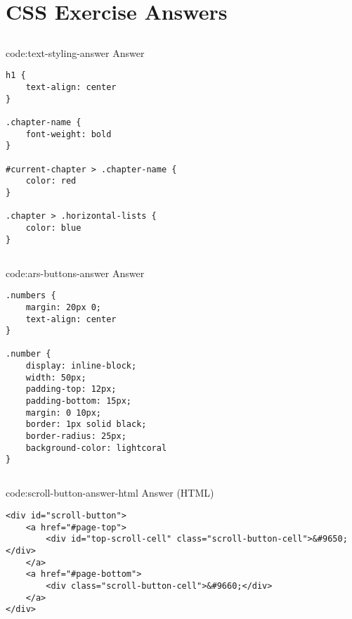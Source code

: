 \section{CSS Exercise Answers}\label{sect:css-exercise-answers}

\subsection*{}

\begin{codeenv}{code:text-styling-answer}{ Answer}\begin{verbatim}
h1 {
    text-align: center
}

.chapter-name {
    font-weight: bold
}

#current-chapter > .chapter-name {
    color: red
}

.chapter > .horizontal-lists {
    color: blue
}
\end{verbatim}
\end{codeenv}

\subsection*{}

\begin{codeenv}{code:ars-buttons-answer}{ Answer}\begin{verbatim}
.numbers {
    margin: 20px 0;
    text-align: center
}

.number {
    display: inline-block;
    width: 50px;
    padding-top: 12px;
    padding-bottom: 15px;
    margin: 0 10px;
    border: 1px solid black;
    border-radius: 25px;
    background-color: lightcoral
}
\end{verbatim}
\end{codeenv}

\subsection*{}

\begin{codeenv}{code:scroll-button-answer-html}{ Answer (HTML)}\begin{verbatim}
<div id="scroll-button">
    <a href="#page-top">
        <div id="top-scroll-cell" class="scroll-button-cell">&#9650;</div>
    </a>
    <a href="#page-bottom">
        <div class="scroll-button-cell">&#9660;</div>
    </a>
</div>
\end{verbatim}
\end{codeenv}

